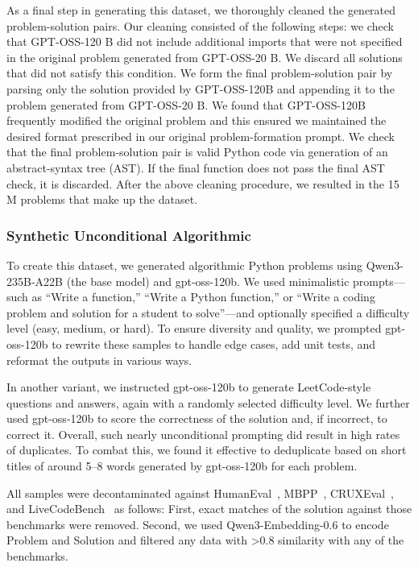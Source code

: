As a final step in generating this dataset, we thoroughly cleaned the generated problem-solution pairs. Our cleaning consisted of the following steps: we check that GPT-OSS-120 B did not include additional imports that were not specified in the original problem generated from GPT-OSS-20 B. We discard all solutions that did not satisfy this condition.
We form the final problem-solution pair by parsing only the solution provided by GPT-OSS-120B and appending it to the problem generated from GPT-OSS-20 B. We found that GPT-OSS-120B frequently modified the original problem and this ensured we maintained the desired format prescribed in our original problem-formation prompt.
We check that the final problem-solution pair is valid Python code via generation of an abstract-syntax tree (AST). If the final function does not pass the final AST check, it is discarded.
After the above cleaning procedure, we resulted in the 15 M problems that make up the dataset.



\subsubsection{Synthetic Unconditional Algorithmic}
To create this dataset, we generated algorithmic Python problems using Qwen3-235B-A22B (the base model) and gpt-oss-120b. We used minimalistic prompts---such as ``Write a function,'' ``Write a Python function,'' or ``Write a coding problem and solution for a student to solve''---and optionally specified a difficulty level (easy, medium, or hard). To ensure diversity and quality, we prompted gpt-oss-120b to rewrite these samples to handle edge cases, add unit tests, and reformat the outputs in various ways.

In another variant, we instructed gpt-oss-120b to generate LeetCode-style questions and answers, again with a randomly selected difficulty level. We further used gpt-oss-120b to score the correctness of the solution and, if incorrect, to correct it. Overall, such nearly unconditional prompting did result in high rates of duplicates. To combat this, we found it effective to deduplicate based on short titles of around 5--8 words generated by gpt-oss-120b for each problem.

All samples were decontaminated against HumanEval~\citep{chen2021evaluatinglargelanguagemodels}, MBPP~\citep{austin2021programsynthesislargelanguage}, CRUXEval~\citep{gu2024cruxevalbenchmarkcodereasoning}, and LiveCodeBench~\citep{jain2024livecodebench} as follows: First, exact matches of the solution against those benchmarks were removed. Second, we used Qwen3-Embedding-0.6 to encode Problem and Solution and filtered any data with >0.8 similarity with any of the benchmarks.

